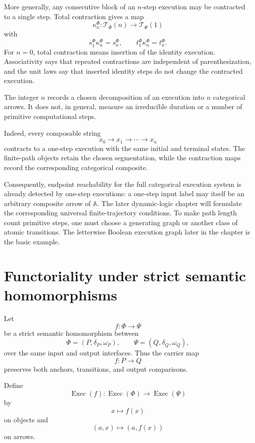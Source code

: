 More generally, any consecutive block of an \(n\)-step execution may be
contracted to a single step. Total contraction gives a map
\[
    \kappa_n^\Phi:
    \mathscr T_\Phi(n)
    \longrightarrow
    \mathscr T_\Phi(1)
\]
with
\[
    s_1^\Phi\kappa_n^\Phi=s_n^\Phi,
    \qquad
    t_1^\Phi\kappa_n^\Phi=t_n^\Phi.
\]
For \(n=0\), total contraction means insertion of the identity execution.
Associativity says that repeated contractions are independent of
parenthesization, and the unit laws say that inserted identity steps do not
change the contracted execution.

\begin{remark}
\label{rem:temporal-extent-segmentation}
The integer \(n\) records a chosen decomposition of an execution into
\(n\) categorical arrows. It does not, in general, measure an irreducible
duration or a number of primitive computational steps.

Indeed, every composable string
\[
    x_0\to x_1\to\cdots\to x_n
\]
contracts to a one-step execution with the same initial and terminal states.
The finite-path objects retain the chosen segmentation, while the contraction
maps record the corresponding categorical composite.

Consequently, endpoint reachability for the full categorical execution
system is already detected by one-step executions: a one-step input label may
itself be an arbitrary composite arrow of \(\mathbb A\).  The later
dynamic-logic chapter will formulate the corresponding universal
finite-trajectory conditions.  To make path length count primitive steps, one
must choose a generating graph or another class of atomic transitions.  The
letterwise Boolean execution graph later in the chapter is the basic example.
\end{remark}

\section{Functoriality under strict semantic homomorphisms}
\label{subsec:temporal-functoriality-strict}

Let
\[
    f:\Phi\to\Psi
\]
be a strict semantic homomorphism between
\[
    \Phi=(P,\delta_P,\omega_P),
    \qquad
    \Psi=(Q,\delta_Q,\omega_Q),
\]
over the same input and output interfaces. Thus the carrier map
\[
    f:P\to Q
\]
preserves both anchors, transitions, and output comparisons.

Define
\[
    \operatorname{Exec}(f):
    \operatorname{Exec}(\Phi)
    \longrightarrow
    \operatorname{Exec}(\Psi)
\]
by
\[
    x\longmapsto f(x)
\]
on objects and
\[
    (a,x)\longmapsto(a,f(x))
\]
on arrows.

